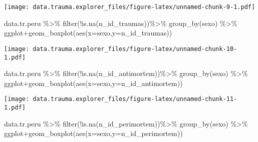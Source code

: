 \documentclass[
]{article}
\newenvironment{Shaded}{\begin{snugshade}}{\end{snugshade}}
\newcommand{\AttributeTok}[1]{\textcolor[rgb]{0.77,0.63,0.00}{#1}}
\newcommand{\FunctionTok}[1]{\textcolor[rgb]{0.00,0.00,0.00}{#1}}
\newcommand{\NormalTok}[1]{#1}
\newcommand{\SpecialCharTok}[1]{\textcolor[rgb]{0.00,0.00,0.00}{#1}}
\begin{document}
\texttt{[image: data.trauma.explorer\_files/figure-latex/unnamed-chunk-9-1.pdf]}

\begin{Shaded}
\begin{Highlighting}[]
\NormalTok{data.tr.peru }\SpecialCharTok{\%\textgreater{}\%} \FunctionTok{filter}\NormalTok{(}\SpecialCharTok{!}\FunctionTok{is.na}\NormalTok{(n\_id\_traumas))}\SpecialCharTok{\%\textgreater{}\%}
                \FunctionTok{group\_by}\NormalTok{(sexo) }\SpecialCharTok{\%\textgreater{}\%}\NormalTok{  ggplot}\SpecialCharTok{+}\FunctionTok{geom\_boxplot}\NormalTok{(}\FunctionTok{aes}\NormalTok{(}\AttributeTok{x=}\NormalTok{sexo,}\AttributeTok{y=}\NormalTok{n\_id\_traumas))}
\end{Highlighting}
\end{Shaded}

\texttt{[image: data.trauma.explorer\_files/figure-latex/unnamed-chunk-10-1.pdf]}

\begin{Shaded}
\begin{Highlighting}[]
\NormalTok{data.tr.peru }\SpecialCharTok{\%\textgreater{}\%} \FunctionTok{filter}\NormalTok{(}\SpecialCharTok{!}\FunctionTok{is.na}\NormalTok{(n\_id\_antimortem))}\SpecialCharTok{\%\textgreater{}\%}
                \FunctionTok{group\_by}\NormalTok{(sexo) }\SpecialCharTok{\%\textgreater{}\%}\NormalTok{  ggplot}\SpecialCharTok{+}\FunctionTok{geom\_boxplot}\NormalTok{(}\FunctionTok{aes}\NormalTok{(}\AttributeTok{x=}\NormalTok{sexo,}\AttributeTok{y=}\NormalTok{n\_id\_antimortem))}
\end{Highlighting}
\end{Shaded}

\texttt{[image: data.trauma.explorer\_files/figure-latex/unnamed-chunk-11-1.pdf]}

\begin{Shaded}
\begin{Highlighting}[]
\NormalTok{data.tr.peru }\SpecialCharTok{\%\textgreater{}\%} \FunctionTok{filter}\NormalTok{(}\SpecialCharTok{!}\FunctionTok{is.na}\NormalTok{(n\_id\_perimortem))}\SpecialCharTok{\%\textgreater{}\%}
                \FunctionTok{group\_by}\NormalTok{(sexo) }\SpecialCharTok{\%\textgreater{}\%}\NormalTok{  ggplot}\SpecialCharTok{+}\FunctionTok{geom\_boxplot}\NormalTok{(}\FunctionTok{aes}\NormalTok{(}\AttributeTok{x=}\NormalTok{sexo,}\AttributeTok{y=}\NormalTok{n\_id\_perimortem))}
\end{Highlighting}
\end{Shaded}
\end{document}
